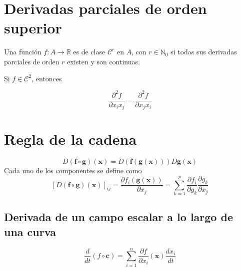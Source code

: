 \documentclass{./Calculo.tex}
\begin{document}
\section{Derivadas parciales de orden superior}
\begin{defin}
Una función $f:A\to \mathbb{R}$ es de clase $\mathcal{C}^{r}$  en $A$, con $r \in \mathbb{N}_{0}$ si todas sus derivadas parciales de orden $r$ existen y son continuas.
\end{defin}
\begin{teorema}
Si $f\in \mathcal{C}^{2}$, entonces
 
$$
\frac{ \partial^{2}f }{ \partial x_{i}x_{j} } = \frac{ \partial^{2}f }{ \partial x_{j}x_{i} }  
$$
\end{teorema}
\section{Regla de la cadena}

$$
D(\mathbf{f}\circ \mathbf{g})(\mathbf{x})=D(\mathbf{f}(\mathbf{g}(\mathbf{x})))D\mathbf{g}(\mathbf{x})
$$
Cada uno de los componentes se define como
$$
[D(\mathbf{f}\circ \mathbf{g})(\mathbf{x})]_{ij} = \frac{ \partial f_{i}(\mathbf{g}(\mathbf{x})) }{ \partial x_{j} }=\sum_{k=1}^{p} \frac{ \partial f_{i} }{ \partial g_{k} }\frac{ \partial g_{k} }{ \partial x_{j} }
$$
\subsection{Derivada de un campo escalar a lo largo de una curva}
$$
\frac{d}{dt} (f\circ \mathbf{c}) = \sum_{i=1}^{n} \frac{ \partial f }{ \partial x_{i} }(\mathbf{x}) \frac{d x_{i}}{dt}
$$
\end{document}
